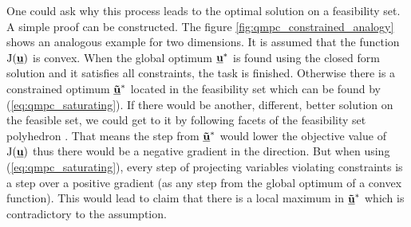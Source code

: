 One could ask why this process leads to the optimal solution on a feasibility set. A simple proof can be constructed. The figure \ref{fig:qmpc_constrained_analogy} shows an analogous example for two dimensions. It is assumed that the function $\mathrm{J}(\textbf{\underline{u}})$ is convex. When the global optimum $\textbf{\underline{u}}^*$ is found using the closed form solution and it satisfies all constraints, the task is finished. Otherwise there is a constrained optimum $\textbf{\underline{\~u}}^*$ located in the feasibility set which can be found by (\ref{eq:qmpc_saturating}). If there would be another, different, better solution on the feasible set, we could get to it by following facets of the feasibility set polyhedron \citep{boyd2004convex}. That means the step from $\textbf{\underline{\~u}}^*$ would lower the objective value of $\mathrm{J}(\textbf{\underline{u}})$ thus there would be a negative gradient in the direction. But when using (\ref{eq:qmpc_saturating}), every step of projecting variables violating constraints is a step over a positive gradient (as any step from the global optimum of a convex function). This would lead to claim that there is a local maximum in $\textbf{\underline{\~u}}^*$ which is contradictory to the assumption.

